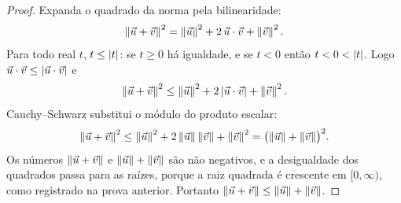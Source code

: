 \documentclass[11pt,a4paper]{article}
\begin{document}
\begin{proof}
Expanda o quadrado da norma pela bilinearidade:
\[
\left\lVert \vec{u}+\vec{v} \right\rVert^2
=\left\lVert \vec{u} \right\rVert^2+2\,\vec{u}\cdot\vec{v}+\left\lVert \vec{v} \right\rVert^2.
\]
Para todo real $t$, $t\le\left\lvert t \right\rvert$: se $t\ge 0$ há igualdade, e se $t<0$ então $t<0<\left\lvert t \right\rvert$. Logo $\vec{u}\cdot\vec{v}\le\left\lvert \vec{u}\cdot\vec{v} \right\rvert$ e
\[
\left\lVert \vec{u}+\vec{v} \right\rVert^2
\le\left\lVert \vec{u} \right\rVert^2+2\left\lvert \vec{u}\cdot\vec{v} \right\rvert+\left\lVert \vec{v} \right\rVert^2.
\]
Cauchy--Schwarz substitui o módulo do produto escalar:
\[
\left\lVert \vec{u}+\vec{v} \right\rVert^2
\le\left\lVert \vec{u} \right\rVert^2+2\left\lVert \vec{u} \right\rVert\left\lVert \vec{v} \right\rVert+\left\lVert \vec{v} \right\rVert^2
=\bigl(\left\lVert \vec{u} \right\rVert+\left\lVert \vec{v} \right\rVert\bigr)^2.
\]
Os números $\left\lVert \vec{u}+\vec{v} \right\rVert$ e $\left\lVert \vec{u} \right\rVert+\left\lVert \vec{v} \right\rVert$ são não negativos, e a desigualdade dos quadrados passa para as raízes, porque a raiz quadrada é crescente em $[0,\infty)$, como registrado na prova anterior. Portanto $\left\lVert \vec{u}+\vec{v} \right\rVert\le\left\lVert \vec{u} \right\rVert+\left\lVert \vec{v} \right\rVert$.
\end{proof}
\end{document}
